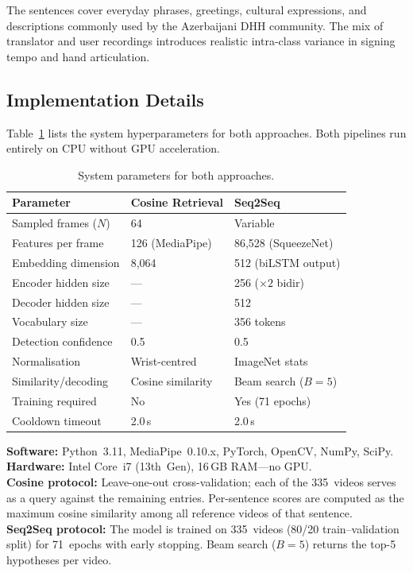\documentclass[runningheads]{llncs}
\begin{document}
The sentences cover everyday phrases, greetings, cultural expressions,
and descriptions commonly used by the Azerbaijani DHH community.
The mix of translator and user recordings introduces realistic
intra-class variance in signing tempo and hand articulation.

\subsection{Implementation Details}\label{sec:implementation}

Table~\ref{tab:system} lists the system hyperparameters for both
approaches.
Both pipelines run entirely on CPU without GPU acceleration.

\begin{table}[t]
\centering
\caption{System parameters for both approaches.}
\label{tab:system}
\begin{tabular}{@{}lll@{}}
\toprule
Parameter & Cosine Retrieval & Seq2Seq \\
\midrule
Sampled frames ($N$) & 64 & Variable \\
Features per frame & 126 (MediaPipe) & 86{,}528 (SqueezeNet) \\
Embedding dimension & 8{,}064 & 512 (biLSTM output) \\
Encoder hidden size & --- & 256 ($\times 2$ bidir) \\
Decoder hidden size & --- & 512 \\
Vocabulary size & --- & 356 tokens \\
Detection confidence & 0.5 & 0.5 \\
Normalisation & Wrist-centred & ImageNet stats \\
Similarity/decoding & Cosine similarity & Beam search ($B\!=\!5$) \\
Training required & No & Yes (71 epochs) \\
Cooldown timeout & 2.0\,s & 2.0\,s \\
\bottomrule
\end{tabular}
\end{table}

\noindent
\textbf{Software:} Python~3.11, MediaPipe~0.10.x, PyTorch, OpenCV,
NumPy, SciPy.\\
\textbf{Hardware:} Intel Core~i7 (13th~Gen), 16\,GB RAM—no GPU.\\
\textbf{Cosine protocol:} Leave-one-out cross-validation; each of the
335~videos serves as a query against the remaining entries.
Per-sentence scores are computed as the maximum cosine similarity
among all reference videos of that sentence.\\
\textbf{Seq2Seq protocol:} The model is trained on 335~videos
(80/20 train--validation split) for 71~epochs with early stopping.
Beam search ($B = 5$) returns the top-5 hypotheses per video.
\end{document}

